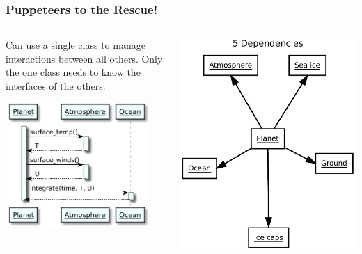 \documentclass[12pt]{beamer}
\begin{document}
\begin{frame}
  \frametitle{Puppeteers to the Rescue!}
  \begin{columns}
    \begin{column}{0.55\textwidth}
      Can use a single class to manage interactions between all
      others. Only the one class needs to know the interfaces of the
      others.
      \begin{center}
        \includegraphics[width=0.9\textwidth]{puppeteer_sequence.pdf}
      \end{center}
    \end{column}
    \begin{column}{0.45\textwidth}
      \includegraphics[width=\textwidth]{puppeteer_deps.pdf}
    \end{column}
  \end{columns}
\end{frame}
\end{document}
